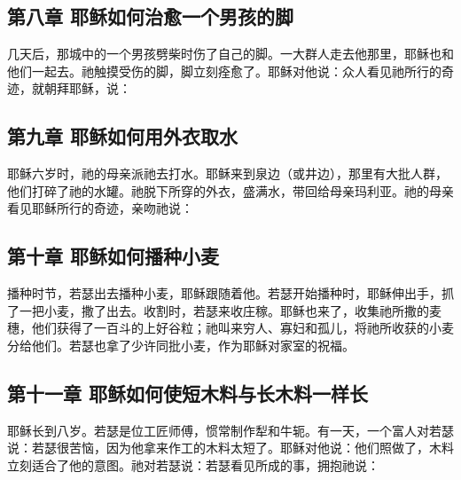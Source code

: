 
\subsection{第八章 耶稣如何治愈一个男孩的脚}

几天后，那城中的一个男孩劈柴时伤了自己的脚。一大群人走去他那里，耶稣也和他们一起去。祂触摸受伤的脚，脚立刻痊愈了。耶稣对他说：众人看见祂所行的奇迹，就朝拜耶稣，说：\par


\subsection{第九章 耶稣如何用外衣取水}

耶稣六岁时，祂的母亲派祂去打水。耶稣来到泉边（或井边），那里有大批人群，他们打碎了祂的水罐。祂脱下所穿的外衣，盛满水，带回给母亲玛利亚。祂的母亲看见耶稣所行的奇迹，亲吻祂说：\par


\subsection{第十章 耶稣如何播种小麦}

播种时节，若瑟出去播种小麦，耶稣跟随着他。若瑟开始播种时，耶稣伸出手，抓了一把小麦，撒了出去。收割时，若瑟来收庄稼。耶稣也来了，收集祂所撒的麦穗，他们获得了一百斗的上好谷粒；祂叫来穷人、寡妇和孤儿，将祂所收获的小麦分给他们。若瑟也拿了少许同批小麦，作为耶稣对家室的祝福。\par


\subsection{第十一章 耶稣如何使短木料与长木料一样长}

耶稣长到八岁。若瑟是位工匠师傅，惯常制作犁和牛轭。有一天，一个富人对若瑟说：若瑟很苦恼，因为他拿来作工的木料太短了。耶稣对他说：他们照做了，木料立刻适合了他的意图。祂对若瑟说：若瑟看见所成的事，拥抱祂说：\par

